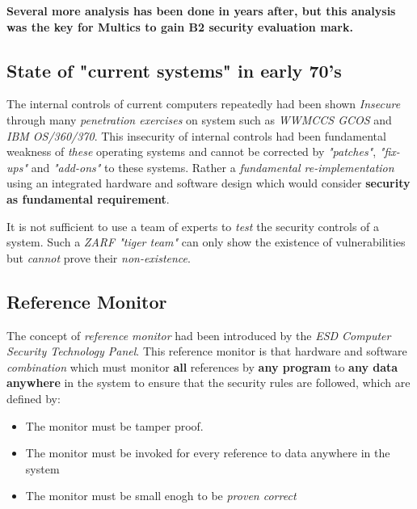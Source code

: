 \textbf{Several more analysis has been done in years after, but this analysis was the key 
for Multics to gain B2 security evaluation mark.}


\subsection{State of "current systems" in early 70's}

The internal controls of current computers repeatedly had been shown \textit{Insecure} through many
\textit{penetration exercises} on system such as \textit{WWMCCS GCOS} and \textit{IBM OS/360/370}.
This insecurity of internal controls had been fundamental weakness of \textit{these} operating systems 
and cannot be corrected by \textit{"patches"}, \textit{"fix-ups"} and \textit{"add-ons"} to these systems.
Rather a \textit{fundamental re-implementation} using an integrated hardware and software design which would 
consider \textbf{security as fundamental requirement}.

It is not sufficient to use a team of experts to \textit{test} the security controls of a system. Such a 
\textit{ZARF "tiger team"} can only show the existence of vulnerabilities but \textit{cannot} 
prove their \textit{non-existence}.

\subsection{Reference Monitor}

The concept of \textit{reference monitor} had been introduced by the \textit{ESD Computer Security 
Technology Panel}. This reference monitor is that hardware and software \textit{combination} which 
must monitor \textbf{all} references by \textbf{any program} to \textbf{any data anywhere} in the 
system to ensure that the security rules are followed, which are defined by:
\begin{itemize}
    \item The monitor must be tamper proof.
    \item The monitor must be invoked for every reference to data anywhere in the system
    \item The monitor must be small enogh to be \textit{proven correct} 
\end{itemize}

